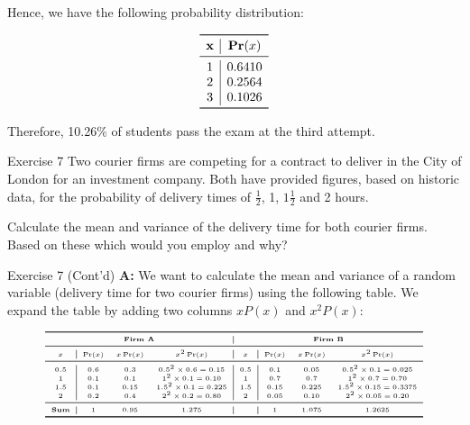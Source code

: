 \documentclass[
  ignorenonframetext,
  aspectratio=43,
]{beamer}
\begin{document}
\begin{frame}{}
\protect\hypertarget{section-5}{}
Hence, we have the following probability distribution:

\[
\begin{array}{c|c}
\toprule
\textbf{x} & \textbf{Pr}(x) \\
\midrule
1 & 0.6410 \\
2 & 0.2564 \\
3 & 0.1026 \\
\bottomrule
\end{array}
\]

Therefore, 10.26\% of students pass the exam at the third attempt.
\end{frame}

\begin{frame}{Exercise 7}
\protect\hypertarget{exercise-7}{}
Two courier firms are competing for a contract to deliver in the City of
London for an investment company. Both have provided figures, based on
historic data, for the probability of delivery times of \(\frac{1}{2}\),
1, \(1 \frac{1}{2}\) and 2 hours.

Calculate the mean and variance of the delivery time for both courier
firms. Based on these which would you employ and why?
\end{frame}

\begin{frame}{Exercise 7 (Cont'd)}
\protect\hypertarget{exercise-7-contd}{}
\textbf{A:} We want to calculate the mean and variance of a random
variable (delivery time for two courier firms) using the following
table. We expand the table by adding two columns \(xP(x)\) and
\(x^2 P(x)\):

\vspace{-10pt}

\[
\centering
\tiny
\begin{array}{c|ccc|c|ccc}
\toprule
\multicolumn{4}{c|}{\textbf{Firm A}} & \multicolumn{4}{c}{\textbf{Firm B}} \\
\midrule
x & \Pr(x) & x\Pr(x) & x^{2}\Pr(x) & x & \Pr(x) & x\Pr(x) & x^{2}\Pr(x) \\
\midrule
0.5 & 0.6 & 0.3 & 0.5^{2}\times0.6=0.15 & 0.5 & 0.1 & 0.05 & 0.5^{2}\times0.1=0.025 \\
1   & 0.1 & 0.1 & 1^{2}\times0.1=0.10   & 1   & 0.7 & 0.7  & 1^{2}\times0.7=0.70 \\
1.5 & 0.1 & 0.15 & 1.5^{2}\times0.1=0.225 & 1.5 & 0.15 & 0.225 & 1.5^{2}\times0.15=0.3375 \\
2   & 0.2 & 0.4 & 2^{2}\times0.2=0.80   & 2   & 0.05 & 0.10 & 2^{2}\times0.05=0.20 \\
\midrule
\textbf{Sum} & 1 & 0.95 & 1.275 & & 1 & 1.075 & 1.2625 \\
\bottomrule
\end{array}
\]
\end{frame}
\end{document}
